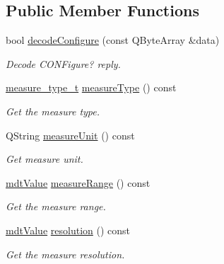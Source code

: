 \subsection*{Public Member Functions}
\begin{DoxyCompactItemize}
\item 
\hypertarget{classmdt_frame_codec_scpi_u3606_a_a178cc4f868b15b8c4591d8333afa84e4}{
bool \hyperlink{classmdt_frame_codec_scpi_u3606_a_a178cc4f868b15b8c4591d8333afa84e4}{decodeConfigure} (const QByteArray \&data)}
\label{classmdt_frame_codec_scpi_u3606_a_a178cc4f868b15b8c4591d8333afa84e4}

\begin{DoxyCompactList}\small\item\em Decode CONFigure? reply. \end{DoxyCompactList}\item 
\hypertarget{classmdt_frame_codec_scpi_u3606_a_a590c72641f56e0f0db6547244b3643ef}{
\hyperlink{classmdt_frame_codec_scpi_u3606_a_a3d7a1de14d77797a08e3d2991fa9f004}{measure\_\-type\_\-t} \hyperlink{classmdt_frame_codec_scpi_u3606_a_a590c72641f56e0f0db6547244b3643ef}{measureType} () const }
\label{classmdt_frame_codec_scpi_u3606_a_a590c72641f56e0f0db6547244b3643ef}

\begin{DoxyCompactList}\small\item\em Get the measure type. \end{DoxyCompactList}\item 
\hypertarget{classmdt_frame_codec_scpi_u3606_a_a866b905ad811baa00342d2a33174f69b}{
QString \hyperlink{classmdt_frame_codec_scpi_u3606_a_a866b905ad811baa00342d2a33174f69b}{measureUnit} () const }
\label{classmdt_frame_codec_scpi_u3606_a_a866b905ad811baa00342d2a33174f69b}

\begin{DoxyCompactList}\small\item\em Get measure unit. \end{DoxyCompactList}\item 
\hypertarget{classmdt_frame_codec_scpi_u3606_a_a068f91a459ddefa33e79ace763fc87fa}{
\hyperlink{classmdt_value}{mdtValue} \hyperlink{classmdt_frame_codec_scpi_u3606_a_a068f91a459ddefa33e79ace763fc87fa}{measureRange} () const }
\label{classmdt_frame_codec_scpi_u3606_a_a068f91a459ddefa33e79ace763fc87fa}

\begin{DoxyCompactList}\small\item\em Get the measure range. \end{DoxyCompactList}\item 
\hypertarget{classmdt_frame_codec_scpi_u3606_a_a4b2d46f6256bd804c85200a2bc1d4dda}{
\hyperlink{classmdt_value}{mdtValue} \hyperlink{classmdt_frame_codec_scpi_u3606_a_a4b2d46f6256bd804c85200a2bc1d4dda}{resolution} () const }
\label{classmdt_frame_codec_scpi_u3606_a_a4b2d46f6256bd804c85200a2bc1d4dda}

\begin{DoxyCompactList}\small\item\em Get the measure resolution. \end{DoxyCompactList}\end{DoxyCompactItemize}


